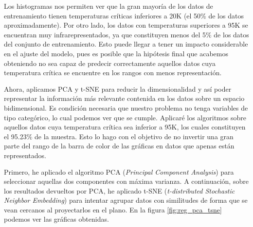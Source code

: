 \documentclass[10pt,a4paper]{article}
\begin{document}
Los histogramas nos permiten ver que la gran mayoría de los datos de entrenamiento tienen temperaturas críticas inferiores a 20K (el 50\% de los datos aproximadamente). Por otro lado, los datos con temperaturas superiores a 95K se encuentran muy infrarepresentados, ya que constituyen menos del 5\% de los datos del conjunto de entrenamiento. Esto puede llegar a tener un impacto considerable en el ajuste del modelo, pues es posible que la hipótesis final que acabemos obteniendo no sea capaz de predecir correctamente aquellos datos cuya temperatura crítica se encuentre en los rangos con menos representación.


Ahora, aplicamos PCA y t-SNE para reducir la dimensionalidad y así poder representar la información más relevante contenida en los datos sobre un espacio bidimensional. Es condición necesaria que nuestro problema no tenga variables de tipo categórico, lo cual podemos ver que se cumple. Aplicaré los algoritmos sobre aquellos datos cuya temperatura crítica sea inferior a 95K, los cuales constituyen el 95.23\% de la muestra. Esto lo hago con el objetivo de no invertir una gran parte del rango de la barra de color de las gráficas en datos que apenas están representados.

Primero, he aplicado el algoritmo PCA (\textit{Principal Component Analysis}) para seleccionar aquellas dos componentes con máxima varianza. A continuación, sobre los resultados devueltos por PCA, he aplicado t-SNE (\textit{t-distributed Stochastic Neighbor Embedding}) para intentar agrupar datos con similitudes de forma que se vean cercanos al proyectarlos en el plano. En la figura \ref{fig:reg_pca_tsne} podemos ver las gráficas obtenidas.
\end{document}
